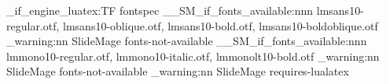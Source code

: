\sys_if_engine_luatex:TF
  {
      {  { fontspec } }
      { \RequirePackage [ no-math ] { fontspec } }
    \__SM_if_fonts_available:nnn
      {
        lmsans10-regular.otf, lmsans10-oblique.otf,
        lmsans10-bold.otf, lmsans10-boldoblique.otf
      }
      {
        \setsansfont
          [
            ItalicFont = { lmsans10-oblique.otf },
            BoldFont = { lmsans10-bold.otf },
            BoldItalicFont = { lmsans10-boldoblique.otf }
          ]
          { lmsans10-regular.otf }
        \renewcommand { \ttdefault } { lmtt }
      }
      { \msg_warning:nn { SlideMage } { fonts-not-available } }
    \__SM_if_fonts_available:nnn
      { lmmono10-regular.otf, lmmono10-italic.otf, lmmonolt10-bold.otf }
      {
        \setmonofont
          [
            ItalicFont = { lmmono10-italic.otf },
            BoldFont = { lmmonolt10-bold.otf }
          ]
          { lmmono10-regular.otf }
      }
      { \msg_warning:nn { SlideMage } { fonts-not-available } }
  }
  { \msg_warning:nn { SlideMage } { requires-lualatex } }

\makeatother
\ExplSyntaxOff

\newcommand{\SMFontAscender}{0.806}
\newcommand{\SMLinespread}{1.15}
\newcommand{\SMParskip}{0.5em}


